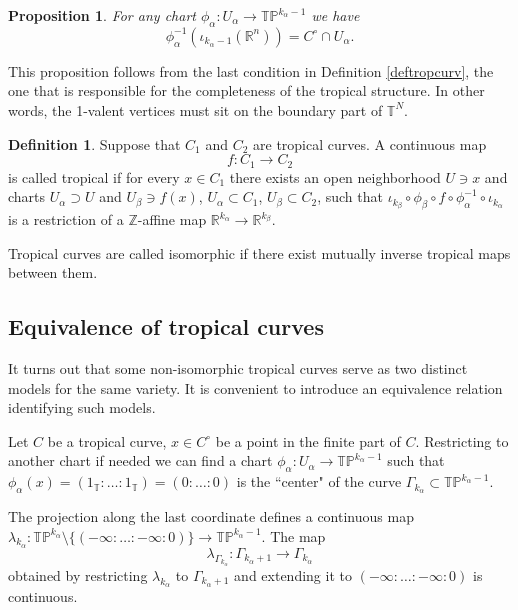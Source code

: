 \documentclass[12pt]{amsart}
\theoremstyle{plain}
\newtheorem{proposition}[theorem]{Proposition}
\theoremstyle{definition}
\newtheorem{definition}[theorem]{Definition}
\theoremstyle{remark}
\newcommand{\Z}{\mathbb Z}    %
\newcommand{\R}{\mathbb R}    %
\newcommand{\PP}{\mathbb P}   %
\newcommand{\T}{\mathbb T}    %
\newcommand{\<}{\langle}   %
\renewcommand{\>}{\rangle} %
\begin{document}
\begin{proposition}
For any chart $\phi_\alpha:U_\alpha\to\T\PP^{k_\alpha-1}$
we have
$$\phi_\alpha^{-1}(\iota_{k_\alpha-1}(\R^n))=C^\circ\cap U_\alpha.$$
\end{proposition}

This proposition follows from the last condition
in Definition \ref{deftropcurv}, the one that is
responsible for the completeness of the tropical structure.
In other words, the 1-valent vertices must sit on the boundary part
of $\T^N$.

\begin{definition}\label{tropmap}
Suppose that $C_1$ and $C_2$ are tropical curves.
A continuous map $$f:C_1\to C_2$$ is called tropical
if for every $x\in C_1$ there exists
an open neighborhood $U\ni x$ and charts
$U_\alpha\supset U$ and $U_\beta\ni f(x)$,
$U_\alpha\subset C_1$, $U_\beta\subset C_2$,
such that
$\iota_{k_\beta}\circ\phi_{\beta}\circ f\circ \phi^{-1}_\alpha\circ\iota_{k_\alpha}$
is a restriction
of a $\Z$-affine map $\R^{k_\alpha}\to\R^{k_\beta}$.

Tropical curves are called isomorphic if there exist
mutually inverse tropical maps between them.
\end{definition}

\subsection{Equivalence of tropical curves}

It turns out that some non-isomorphic tropical curves
serve as two distinct models for the same variety.
It is convenient to introduce an equivalence relation
identifying such models.

Let $C$ be a tropical curve, $x\in C^\circ$ be a point
in the finite part of $C$.
Restricting to another chart if needed
we can find a chart $\phi_\alpha:U_\alpha\to\T\PP^{k_\alpha-1}$
such that $\phi_\alpha(x)=(1_{\T}:\dots:1_{\T})=(0:\dots:0)$
is the ``center" of the curve $\Gamma_{k_\alpha}\subset\T\PP^{k_\alpha-1}$.

The projection along the last coordinate defines a continuous map
$\lambda_{k_\alpha}:\T\PP^{k_\alpha}\setminus\{(-\infty:\dots:-\infty:0)\}
\to \T\PP^{k_\alpha-1}.$
The map
\begin{equation}\label{lambdagamma}
\lambda_{\Gamma_{k_\alpha}}:
\Gamma_{k_\alpha+1}\to\Gamma_{k_\alpha}
\end{equation}
obtained by restricting $\lambda_{k_\alpha}$ to $\Gamma_{k_\alpha+1}$
and extending it to $(-\infty:\dots:-\infty:0)$ is continuous.
\end{document}
